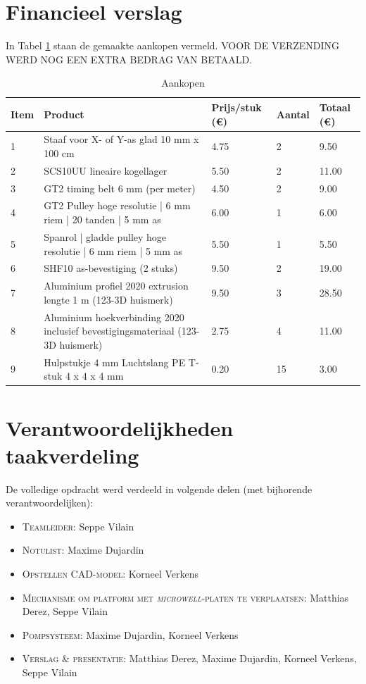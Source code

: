 \documentclass[a4paper,twoside,kulak]{kulakreport} %
\begin{document}
\section*{Financieel verslag}

In Tabel \ref{tab:financieelVerslag} staan de gemaakte aankopen vermeld. VOOR DE VERZENDING WERD NOG EEN EXTRA BEDRAG VAN    BETAALD.


\begin{table}[]
	\sffamily
	\caption{Aankopen}
	\begin{tabular}{@{}lllll@{}}
		\toprule
		  Item & Product & Prijs/stuk (\euro) & Aantal & Totaal (\euro)   \\ \midrule
		1 & Staaf voor X- of Y-as glad 10 mm x 100 cm & 4.75 & 2 & 9.50 \\
		2 & SCS10UU lineaire kogellager  & 5.50 & 2 & 11.00 \\
		3 & GT2 timing belt 6 mm (per meter)  & 4.50 & 2 & 9.00 \\
		4 & GT2 Pulley hoge resolutie | 6 mm riem | 20 tanden | 5 mm as & 6.00 & 1 & 6.00 \\
		5 & Spanrol | gladde pulley hoge resolutie | 6 mm riem | 5 mm as & 5.50 & 1 & 5.50 \\
		6 & SHF10 as-bevestiging (2 stuks) & 9.50 & 2 & 19.00 \\
		7 & Aluminium profiel 2020 extrusion lengte 1 m (123-3D huismerk)  & 9.50 & 3 & 28.50 \\
		8 & Aluminium hoekverbinding 2020 inclusief bevestigingsmateriaal (123-3D huismerk) & 2.75 & 4 & 11.00 \\
		9 & Hulpstukje 4 mm Luchtslang PE T-stuk 4 x 4 x 4 mm & 0.20 & 15 & 3.00 \\
		\bottomrule
	\end{tabular}
	\label{tab:financieelVerslag}

	
\end{table}

\clearpage

\section*{Verantwoordelijkheden taakverdeling}

De volledige opdracht werd verdeeld in volgende delen (met bijhorende verantwoordelijken):
\begin{itemize}
	\item \textsc{Teamleider:} Seppe Vilain
	\item \textsc{Notulist}: Maxime Dujardin
	\item \textsc{Opstellen CAD-model}: Korneel Verkens
	\item \textsc{Mechanisme om platform met \textit{microwell}-platen te verplaatsen:} Matthias Derez, Seppe Vilain
	\item \textsc{Pompsysteem:} Maxime Dujardin, Korneel Verkens
	\item \textsc{Verslag \& presentatie:} Matthias Derez, Maxime Dujardin, Korneel Verkens, Seppe Vilain
	
\end{itemize}
\end{document}
